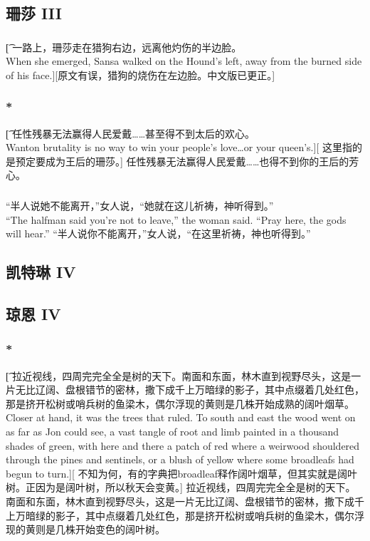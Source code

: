 \documentclass[12pt,a4paper]{article}
\begin{document}
\subsection{珊莎 III}
\subsubsection{}\t[
	一路上，珊莎走在猎狗右边，远离他灼伤的半边脸。\\
	When she emerged, Sansa walked on the Hound's left, away from the burned side of his face.][原文有误，猎狗的烧伤在左边脸。中文版已更正。]
	

\subsubsection{\color{red}*}\t[
	任性残暴无法赢得人民爱戴……甚至得不到太后的欢心。\\
	Wanton brutality is no way to win your people's love\ldots or your queen's.][
	这里指的是预定要成为王后的珊莎。]
	任性残暴无法赢得人民爱戴……也得不到你的王后的芳心。
	
\subsubsection{}{\color{blue}
	“半人说她不能离开，”女人说，“她就在这儿祈祷，神听得到。”\\
	“The halfman said you're not to leave,” the woman said. “Pray here, the gods will hear.”}
	“半人说你不能离开，”女人说，“在这里祈祷，神也听得到。”
	
\subsection{凯特琳 IV}

\subsection{琼恩 IV}
\subsubsection{\color{red}*}\t[
	拉近视线，四周完完全全是树的天下。南面和东面，林木直到视野尽头，这是一片无比辽阔、盘根错节的密林，撒下成千上万暗绿的影子，其中点缀着几处红色，那是挤开松树或哨兵树的鱼梁木，偶尔浮现的黄则是几株开始成熟的阔叶烟草。\\
	Closer at hand, it was the trees that ruled. To south and east the wood went on as far as Jon could see, a vast tangle of root and limb painted in a thousand shades of green, with here and there a patch of red where a weirwood shouldered through the pines and sentinels, or a blush of yellow where some broadleafs had begun to turn.][
	不知为何，有的字典把broadleaf释作阔叶烟草，但其实就是阔叶树。正因为是阔叶树，所以秋天会变黄。]
	拉近视线，四周完完全全是树的天下。南面和东面，林木直到视野尽头，这是一片无比辽阔、盘根错节的密林，撒下成千上万暗绿的影子，其中点缀着几处红色，那是挤开松树或哨兵树的鱼梁木，偶尔浮现的黄则是几株开始变色的阔叶树。
\end{document}
